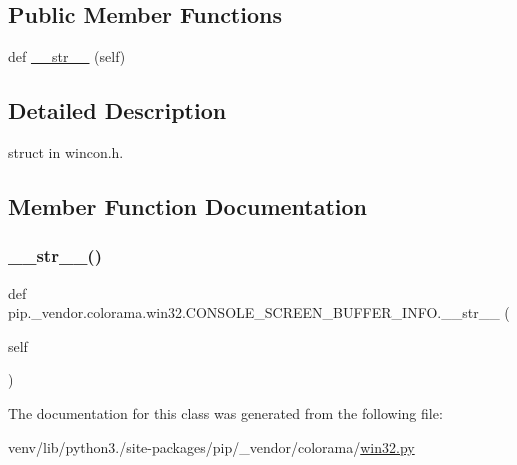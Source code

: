 \subsection*{Public Member Functions}
\begin{DoxyCompactItemize}
\item 
def \hyperlink{classpip_1_1__vendor_1_1colorama_1_1win32_1_1CONSOLE__SCREEN__BUFFER__INFO_a306c882ab23ff1d625c15a8e054f0cc0}{\+\_\+\+\_\+str\+\_\+\+\_\+} (self)
\end{DoxyCompactItemize}


\subsection{Detailed Description}
\begin{DoxyVerb}struct in wincon.h.\end{DoxyVerb}
 

\subsection{Member Function Documentation}
\mbox{\label{classpip_1_1__vendor_1_1colorama_1_1win32_1_1CONSOLE__SCREEN__BUFFER__INFO_a306c882ab23ff1d625c15a8e054f0cc0}} 
\subsubsection{\texorpdfstring{\+\_\+\+\_\+str\+\_\+\+\_\+()}{\_\_str\_\_()}}
{\footnotesize\ttfamily def pip.\+\_\+vendor.\+colorama.\+win32.\+C\+O\+N\+S\+O\+L\+E\+\_\+\+S\+C\+R\+E\+E\+N\+\_\+\+B\+U\+F\+F\+E\+R\+\_\+\+I\+N\+F\+O.\+\_\+\+\_\+str\+\_\+\+\_\+ (\begin{DoxyParamCaption}\item[{}]{self }\end{DoxyParamCaption})}



The documentation for this class was generated from the following file\+:\begin{DoxyCompactItemize}
\item 
venv/lib/python3./site-\/packages/pip/\+\_\+vendor/colorama/\hyperlink{win32_8py}{win32.\+py}\end{DoxyCompactItemize}
